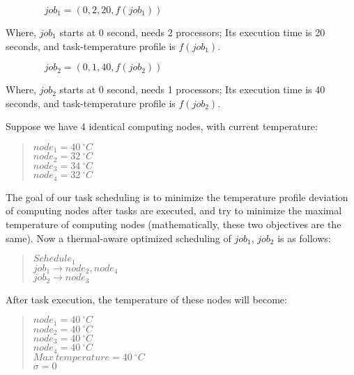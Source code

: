 $~~~~~~~~~~~~~~~~~~job_1=(0, 2, 20, f(job_1))$

Where, $job_1$ starts at 0 second, needs 2 processors; Its execution time is 20 seconds, and task-temperature profile is $f(job_1)$.

$~~~~~~~~~~~~~~~~~~job_2=(0, 1, 40, f(job_2))$

Where, $job_2$ starts at 0 second, needs 1 processors; Its execution time is 40 seconds, and task-temperature profile is $f(job_2)$.

Suppose we have 4 identical computing nodes, with current temperature: 

\begin{quote}
$node_1=40~^\circ C$ \\
$node_2=32~^\circ C$ \\
$node_3=34~^\circ C$ \\
$node_4=32~^\circ C$ \\
\end{quote}

The goal of our task scheduling is to minimize the temperature profile deviation of computing nodes after tasks are  executed, and try to minimize the maximal temperature of computing nodes (mathematically, these two objectives are the same). Now a thermal-aware optimized scheduling of $job_1$, $job_2$ is as follows:

\begin{quote}
$Schedule_1$\\
$job_1\to node_2, node_4$\\
$job_2 \to node_3$\\
\end{quote}

After task execution, the temperature of these nodes will become:

\begin{quote}
$node_1=40~^\circ C$ \\
$node_2=40~^\circ C$ \\
$node_3=40~^\circ C$ \\
$node_4=40~^\circ C$ \\
$Max~temperature=40~^\circ C$ \\
$\sigma =0$ \\
\end{quote}

